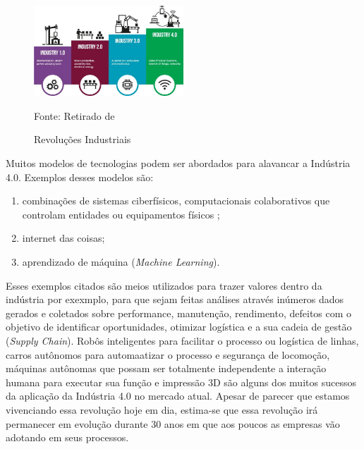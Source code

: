 \documentclass[../../layout.tex]{subfiles}
\begin{document}
\begin{figure}[H]
\centering
\caption{Revoluções Industriais}
\includegraphics[width=0.5\textwidth]{assets/static/img/ind4.jpg}
\label{fig:i2c}

\begin{minipage}{0.5\textwidth}
\raggedright \footnotesize Fonte: Retirado de  
\end{minipage}
\end{figure}


\hspace*{3em}Muitos modelos de tecnologias podem ser abordados para alavancar a Indústria 4.0. Exemplos desses modelos são:
\begin{enumerate}[label=\alph*)]
\itemsep0em
    \item combinações de sistemas ciberfísicos, computacionais colaborativos que controlam entidades ou equipamentos físicos ;
    \item internet das coisas;
    \item aprendizado de máquina (\emph{Machine Learning}).
\end{enumerate}

\hspace*{3em}Esses exemplos citados são meios utilizados para trazer valores dentro da indústria por exexmplo, para que sejam feitas análises através inúmeros dados gerados e coletados sobre performance, manutenção, rendimento, defeitos com o objetivo de identificar oportunidades, otimizar logística e a sua cadeia de gestão (\emph{Supply Chain}). Robôs inteligentes para facilitar o processo ou logística de linhas, carros autônomos para automaatizar o processo e segurança de locomoção, máquinas autônomas que possam ser totalmente independente a interação humana para executar sua função e impressão 3D são alguns dos muitos sucessos da aplicação da Indústria 4.0 no mercado atual. Apesar de parecer que estamos vivenciando essa revolução hoje em dia, estima-se que essa revolução irá permanecer em evolução durante 30 anos em que aos poucos as empresas vão adotando em seus processos.
\end{document}
